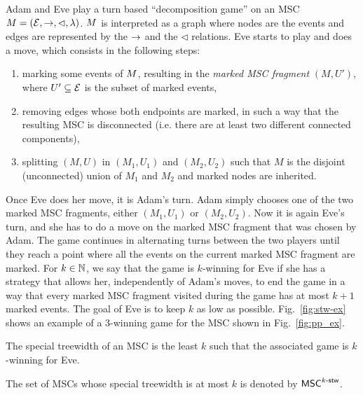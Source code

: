 Adam and Eve play a turn based ``decomposition game'' on an MSC $M = (\mathcal{E}, \to, \lhd, \lambda)$. $M$ is interpreted as a graph where nodes are the events and edges are represented by the $\to$ and the $\lhd$ relations.
Eve starts to play and does a move, which consists in the following steps:
\begin{enumerate}
	\item marking some events of $M$, resulting in the \emph{marked MSC fragment} $(M, U')$, where $U' \subseteq \mathcal{E}$ is the subset of marked events,
	\item removing edges whose both endpoints are marked, in such a way that the resulting MSC is disconnected (i.e. there are at least two different connected components),
	\item splitting $(M, U)$ in $(M_1, U_1)$ and $(M_2, U_2)$ such that $M$ is the disjoint (unconnected) union of $M_1$ and $M_2$
	and marked nodes are inherited.
\end{enumerate}
Once Eve does her move, it is Adam's turn. Adam simply chooses one of the two marked MSC fragments, either $(M_1, U_1)$ or $(M_2, U_2)$. Now it is again Eve's turn, and she has to do a move on the marked MSC fragment that was chosen by Adam. The game continues in alternating turns between the two players until they reach a point where all the events on the current marked MSC fragment are marked.
For $k \in \mathbb{N}$, we say that the game is $k$-winning for Eve if she has a strategy that allows her, independently of Adam's moves, to end the game in a way that every marked MSC fragment visited during the game has at most $k+1$ marked events. The goal of Eve is to keep $k$ as low as possible. Fig.~\ref{fig:stw-ex} shows an example of a 3-winning game for the MSC shown in Fig.~\ref{fig:pp_ex}.



\newcommand{\CS}[2]{\mathsf{CS}_{(#1,#2)}}
\newcommand{\MSO}[2]{\mathsf{MSO}_{(#1,#2)}}
\newcommand{\LCPDL}[2]{\mathsf{LCPDL}_{(#1,#2)}}
\newcommand{\MSCpm}[2]{\mathsf{MSC}_{(#1,#2)}}
\newcommand{\mbMSCpm}[2]{\mathsf{MSC}_{(#1,#2)}^{\mathsf{mb}}}


\begin{fact}
	The special treewidth of an MSC is the least $k$ such that
	the associated game is $k$-winning for Eve.
\end{fact}

The set of MSCs whose special treewidth is at most $k$ is denoted by $\mathsf{MSC}^{k\textup{-}\mathsf{stw}}$.

